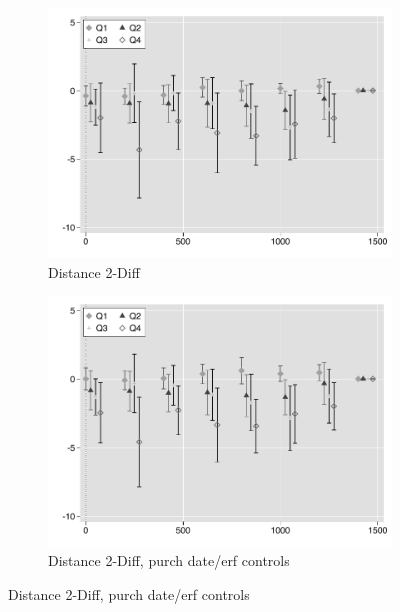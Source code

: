 \documentclass[12pt]{article}
\begin{document}
\begin{figure}
\begin{subfigure}[b]{0.48\textwidth}
        \end{subfigure}
        \begin{subfigure}[b]{0.48\textwidth}
                    \caption[Network2]%
            {{\footnotesize Distance 2-Diff}}    
            \label{fig:prefor}
            \centering
            \includegraphics[width=\textwidth,trim={0.3cm .3cm 0.1cm 0cm}, clip=true]{figures/freq_dist_2d_no_ctrl_q}
        \end{subfigure}
        \hfill
        \begin{subfigure}[b]{0.48\textwidth}
                    \caption[Network2]%
            {{\footnotesize Distance 2-Diff, purch date/erf controls}}    
            \label{fig:prefor}
            \centering
            \includegraphics[width=\textwidth,trim={0.3cm .3cm 0.1cm 0cm}, clip=true]{figures/freq_dist_2d_ctrl_q}
        \end{subfigure}
       
\end{figure}
\end{document}
